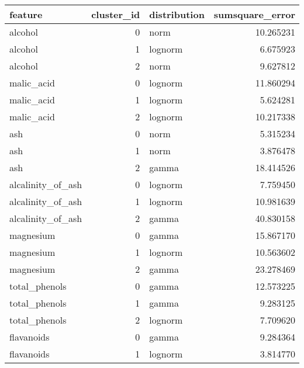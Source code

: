 \begin{tabular}{lrlr}
\toprule
                     feature &  cluster\_id & distribution &  sumsquare\_error \\
\midrule
                     alcohol &           0 &         norm &        10.265231 \\
                     alcohol &           1 &      lognorm &         6.675923 \\
                     alcohol &           2 &         norm &         9.627812 \\
                  malic\_acid &           0 &      lognorm &        11.860294 \\
                  malic\_acid &           1 &      lognorm &         5.624281 \\
                  malic\_acid &           2 &      lognorm &        10.217338 \\
                         ash &           0 &         norm &         5.315234 \\
                         ash &           1 &         norm &         3.876478 \\
                         ash &           2 &        gamma &        18.414526 \\
           alcalinity\_of\_ash &           0 &      lognorm &         7.759450 \\
           alcalinity\_of\_ash &           1 &      lognorm &        10.981639 \\
           alcalinity\_of\_ash &           2 &        gamma &        40.830158 \\
                   magnesium &           0 &        gamma &        15.867170 \\
                   magnesium &           1 &      lognorm &        10.563602 \\
                   magnesium &           2 &        gamma &        23.278469 \\
               total\_phenols &           0 &        gamma &        12.573225 \\
               total\_phenols &           1 &        gamma &         9.283125 \\
               total\_phenols &           2 &      lognorm &         7.709620 \\
                  flavanoids &           0 &        gamma &         9.284364 \\
                  flavanoids &           1 &      lognorm &         3.814770 \\

\end{tabular}
